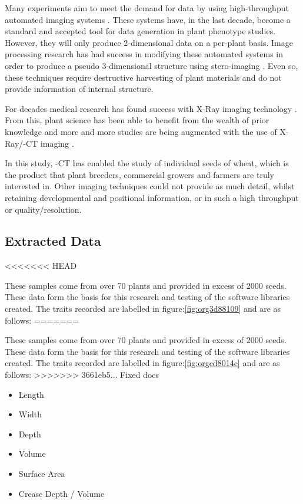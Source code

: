 \documentclass[11pt]{report}
\begin{document}
Many experiments aim to meet the demand for data by using high-throughput automated imaging systems \cite{Naumann2007,Prasanna2013,Humplik2015}. These systems have, in the last decade, become a standard and accepted tool for data generation in plant phenotype studies. However, they will only produce 2-dimensional data on a per-plant basis. Image processing research has had success in modifying these automated systems in order to produce a pseudo 3-dimensional structure using stero-imaging \cite{Roussel2016}. Even so, these techniques require destructive harvesting of plant materials and do not provide information of internal structure.

For decades medical research has found success with X-Ray imaging technology \cite{Wang2008}. From this, plant science has been able to benefit from the wealth of prior knowledge and more and more studies are being augmented with the use of X-Ray/\textmu{}-CT imaging \cite{Jhala2015,Tracy2012,Metzner2015,Hughes2017,Staedler2013}.

In this study, \textmu{}-CT has enabled the study of individual seeds of wheat, which is the product that plant breeders, commercial growers and farmers are truly interested in. Other imaging techniques could not provide as much detail, whilst retaining developmental and positional information, or in such a high throughput or quality/resolution.

\subsection{Extracted Data}
<<<<<<< HEAD
\label{sec:org3fe7a7a}

These samples come from over 70 plants and provided in excess of 2000 seeds. These data form the basis for this research and testing of the software libraries created. The traits recorded are labelled in figure:\ref{fig:org3d88109} and are as follows:
=======
\label{sec:org91c0f20}

These samples come from over 70 plants and provided in excess of 2000 seeds. These data form the basis for this research and testing of the software libraries created. The traits recorded are labelled in figure:\ref{fig:orgcd8014c} and are as follows:
>>>>>>> 3661eb5... Fixed docs

\begin{multicols}{2}

  \begin{itemize}
  \item Length
  \item Width
  \item Depth

  \end{itemize}

  \columnbreak

  \begin{itemize}
  \item Volume
  \item Surface Area
  \item Crease Depth / Volume
  \end{itemize}
\end{multicols}
\end{document}
